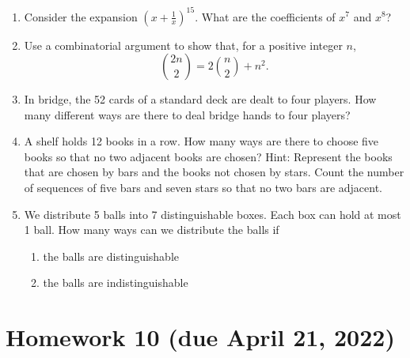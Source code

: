 \documentclass[letterpaper, 12pt]{article}
\begin{document}
\begin{enumerate}
    \item Consider the expansion $\left(x + \frac{1}{x}\right)^{15}$. What are the coefficients of $x^7$ and $x^8$?
    \item Use a combinatorial argument to show that, for a positive integer $n$,
    \[\binom{2n}{2} = 2 \binom{n}{2} + n^2.\]
    \item In bridge, the 52 cards of a standard deck are dealt to four players. How many different ways are there to deal bridge hands to four players?
    \item  A shelf holds 12 books in a row. How many ways are there to choose five books so that no two adjacent books are chosen? Hint: Represent the books that are chosen by bars and the books not chosen by stars. Count the number of sequences of five bars and seven stars so that no two bars are adjacent.
    \item We distribute 5 balls into 7 distinguishable boxes. Each box can hold at most 1 ball. How many ways can we distribute the balls if
    \begin{enumerate}
        \item the balls are distinguishable
        \item the balls are indistinguishable
    \end{enumerate}
\end{enumerate}

\section*{Homework 10 (due April 21, 2022)}
\end{document}
